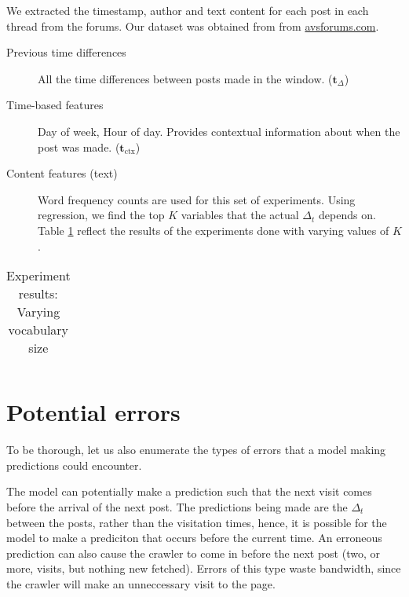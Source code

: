 \newcommand{\vocab}{\mathbf{v}}
\newcommand{\dtvec}{\mathbf{t}_\Delta}
\newcommand{\ctxvec}{\mathbf{t}_\text{ctx}}
\newcommand{\dt}{\Delta_t}
\newcommand{\prerror}{Pr_{error}}
\newcommand{\fvec}{\mathbf{x}}
\newcommand{\weights}{\mathbf{w}}
\newcommand{\X}{\mathbf{X}}
We extracted the timestamp, author and text content for each post in each thread
from the forums. Our dataset was obtained from from \url{avsforums.com}.
\begin{description}
	\item[Previous time differences] All the time differences between posts made in the window. ($\dtvec$)
	\item[Time-based features] Day of week, Hour of day. Provides contextual information about when the post was made. ($\ctxvec$)
	
	\item[Content features (text)]
		Word frequency counts are used for this set of experiments. Using regression, we find the top $K$ variables that the actual $\dt$ depends on. Table \ref{vocab_exp} reflect the results of the experiments done with varying values of $K$.

\end{description}


\begin{table}
	\footnotesize
	\begin{centering}
	\begin{tabular}{|l|c|c|c|c|c|c|c|c|}
	\hline
	
	\hline
	\end{tabular}
	\caption{Experiment results: Varying vocabulary size}
	\label{vocab_exp}
\end{centering}
\end{table}

\section{Potential errors}
To be thorough, let us also enumerate the types of errors that a model making predictions could encounter.

The model can potentially make a prediction such that the next visit comes before the arrival of the next post. The predictions being made are the $\dt$ between the posts, rather than the visitation times, hence, it is possible for the model to make a prediciton that occurs before the current time. An erroneous prediction can also cause the crawler to come in before the next post (two, or more, visits, but nothing new fetched). Errors of this type waste bandwidth, since the crawler will make an unneccessary visit to the page.


